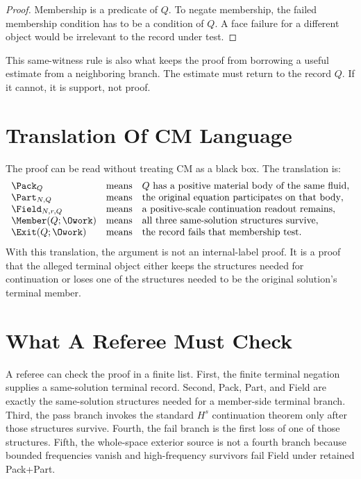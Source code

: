 \begin{proof}
Membership is a predicate of \(Q\).
To negate membership, the failed membership condition has to be a condition of \(Q\).
A face failure for a different object would be irrelevant to the record under test.
\end{proof}

This same-witness rule is also what keeps the proof from borrowing a useful estimate from a neighboring branch.
The estimate must return to the record \(Q\).
If it cannot, it is support, not proof.

\section{Translation Of CM Language}

The proof can be read without treating CM as a black box.
The translation is:
\[
\begin{array}{lll}
\Pack_Q & \text{means} & \text{\(Q\) has a positive material body of the same fluid},\\
\Part_{N,Q} & \text{means} & \text{the original equation participates on that body},\\
\Field_{N,r,Q} & \text{means} & \text{a positive-scale continuation readout remains},\\
\Member(Q;\Owork) & \text{means} & \text{all three same-solution structures survive},\\
\Exit(Q;\Owork) & \text{means} & \text{the record fails that membership test}.
\end{array}
\]
With this translation, the argument is not an internal-label proof.
It is a proof that the alleged terminal object either keeps the structures needed for continuation or loses one of the structures needed to be the original solution's terminal member.

\section{What A Referee Must Check}

A referee can check the proof in a finite list.
First, the finite terminal negation supplies a same-solution terminal record.
Second, Pack, Part, and Field are exactly the same-solution structures needed for a member-side terminal branch.
Third, the pass branch invokes the standard \(H^s\) continuation theorem only after those structures survive.
Fourth, the fail branch is the first loss of one of those structures.
Fifth, the whole-space exterior source is not a fourth branch because bounded frequencies vanish and high-frequency survivors fail Field under retained Pack+Part.

